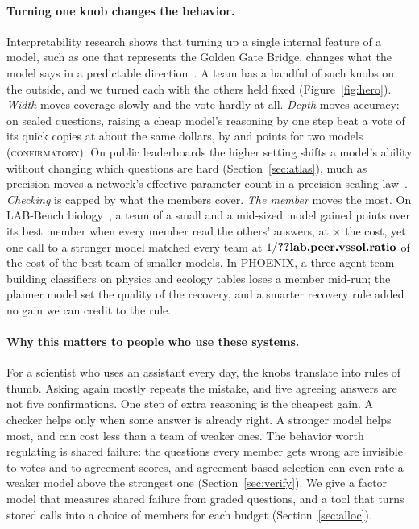 \documentclass{article}
\newcommand{\status}[1]{{\upshape\textsc{\small #1}}}
\begin{document}
\paragraph{Turning one knob changes the behavior.} Interpretability research shows that turning up a single internal
feature of a model, such as one that represents the Golden Gate Bridge, changes what the model says in a predictable
direction~\citep{templeton2024scaling}. A team has a handful of such knobs on the outside, and we turned each with the
others held fixed (Figure~\ref{fig:hero}). \emph{Width} moves coverage slowly and the vote hardly at all. \emph{Depth}
moves accuracy: on  sealed questions, raising a cheap model's reasoning by one step beat a vote of
its quick copies at about the same dollars, by  and  points for two models
(\status{confirmatory}). On public leaderboards the higher setting shifts a model's ability without changing which
questions are hard (Section~\ref{sec:atlas}), much as precision moves a network's effective parameter count in a
precision scaling law~\citep{kumar2024precision}. \emph{Checking} is capped by what the members cover. \emph{The
member} moves the most. On LAB-Bench biology~\citep{laurent2024labbench}, a team of a small and a mid-sized model gained
 points over its best member when every member read the others' answers, at
$\times$ the cost, yet one call to a stronger model matched every team at
$1/\nm{lab.peer.vssol.ratio}$ of the cost of the best team of smaller models. In PHOENIX, a three-agent team building
classifiers on physics and ecology tables loses a member mid-run; the planner model set the quality of the recovery,
and a smarter recovery rule added no gain we can credit to the rule.

\paragraph{Why this matters to people who use these systems.} For a scientist who uses an assistant every day, the
knobs translate into rules of thumb. Asking again mostly repeats the mistake, and five agreeing answers are not five
confirmations. One step of extra reasoning is the cheapest gain. A checker helps only when some answer is already
right. A stronger model helps most, and can cost less than a team of weaker ones. The behavior worth regulating is
shared failure: the questions every member gets wrong are invisible to votes and to agreement scores, and
agreement-based selection can even rate a weaker model above the strongest one (Section~\ref{sec:verify}). We give a
factor model that measures shared failure from graded questions, and a tool that turns stored calls into a choice of
members for each budget (Section~\ref{sec:alloc}).
\end{document}

